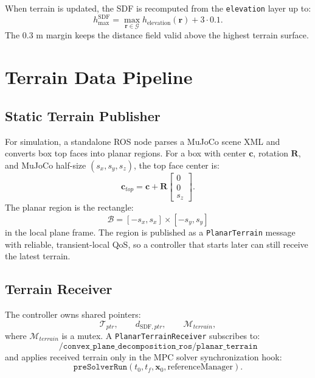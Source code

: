 \documentclass[11pt,a4paper]{article}
\begin{document}
When terrain is updated, the SDF is recomputed from the \texttt{elevation} layer up to:
\begin{equation}
	h_{\max}^{\text{SDF}}
	=
	\max_{\bm{r}\in\mathcal{G}} h_{\text{elevation}}(\bm{r})
	+
	3\cdot 0.1.
\end{equation}
The $0.3$ m margin keeps the distance field valid above the highest terrain surface.


\section{Terrain Data Pipeline}

\subsection{Static Terrain Publisher}

For simulation, a standalone ROS node parses a MuJoCo scene XML and converts box top faces into planar regions. For a box with center $\bm{c}$, rotation $\bm{R}$, and MuJoCo half-size $(s_x,s_y,s_z)$, the top face center is:
\begin{equation}
	\bm{c}_{top}
	=
	\bm{c}
	+
	\bm{R}
	\begin{bmatrix}
		0\\0\\s_z
	\end{bmatrix}.
\end{equation}
The planar region is the rectangle:
\begin{equation}
	\mathcal{B}
	=
	[-s_x,s_x]\times[-s_y,s_y]
\end{equation}
in the local plane frame. The region is published as a \texttt{PlanarTerrain} message with reliable, transient-local QoS, so a controller that starts later can still receive the latest terrain.

\subsection{Terrain Receiver}

The controller owns shared pointers:
\begin{equation}
	\mathcal{T}_{ptr},\qquad d_{\text{SDF},ptr},\qquad \mathcal{M}_{terrain},
\end{equation}
where $\mathcal{M}_{terrain}$ is a mutex. A \texttt{PlanarTerrainReceiver} subscribes to:
\begin{equation}
	\texttt{/convex\_plane\_decomposition\_ros/planar\_terrain}
\end{equation}
and applies received terrain only in the MPC solver synchronization hook:
\begin{equation}
	\texttt{preSolverRun}(t_0,t_f,\bm{x}_0,\text{referenceManager}).
\end{equation}
\end{document}
